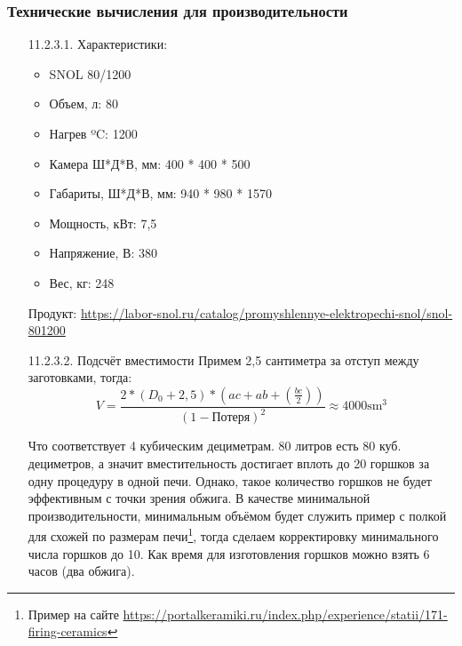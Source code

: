 \documentclass[16pt,a4paper]{article}
\begin{document}
\subsubsection{Технические вычисления для производительности}
\label{sec:at3}
\begin{enumerate}
    \item [11.2.3.1.] Характеристики:
\begin{itemize}
    \item SNOL 80/1200
    \item Объем, л: 80
    \item Нагрев ºC: 1200
    \item Камера Ш*Д*В, мм: 400 * 400 * 500
    \item Габариты, Ш*Д*В, мм: 940 * 980 * 1570
    \item Мощность, кВт: 7,5
    \item Напряжение, В: 380
    \item Вес, кг: 248
\end{itemize}
Продукт: \url{https://labor-snol.ru/catalog/promyshlennye-elektropechi-snol/snol-801200}
    \item [11.2.3.2.] Подсчёт вместимости
    Примем 2,5 сантиметра за отступ между заготовками, тогда:
    $$V=\frac{2*(D_0+2,5)*(ac+ab+(\frac{bc}{2}))}{(1-\text{Потеря})^2} \approx 4000\text{sm}^3$$
    
    Что соответствует 4 кубическим дециметрам. 80 литров есть 80 куб. дециметров, а значит вместительность достигает вплоть до 20 горшков за одну процедуру в одной печи. Однако, такое количество горшков не будет эффективным с точки зрения обжига. В качестве минимальной производительности, минимальным объёмом будет служить пример с полкой для схожей по размерам печи\footnote{Пример на сайте \url{https://portalkeramiki.ru/index.php/experience/statii/171-firing-ceramics}}, тогда сделаем корректировку минимального числа горшков до 10.
    Как время для изготовления горшков можно взять 6 часов (два обжига).
\end{enumerate}
\end{document}
